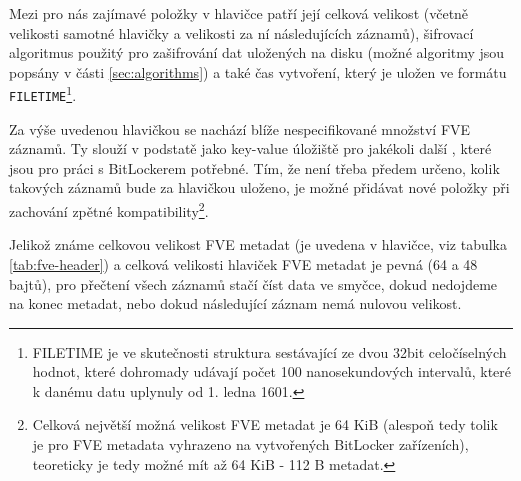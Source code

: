 
Mezi pro nás zajímavé položky v hlavičce patří její celková velikost (včetně velikosti samotné hlavičky a velikosti za ní následujících záznamů), šifrovací algoritmus použitý pro zašifrování dat uložených na disku (možné algoritmy jsou popsány v části \ref{sec:algorithms}) a také čas vytvoření, který je uložen ve formátu \texttt{FILETIME}\footnote{FILETIME je ve skutečnosti struktura sestávající ze dvou 32bit celočíselných hodnot, které dohromady udávají počet 100 nanosekundových intervalů, které k danému datu uplynuly od 1. ledna 1601.\cite{Zxwr6wjYZUQ6z8Yp}}.

\label{sec:fve-metadata-entry}

Za výše uvedenou hlavičkou se nachází blíže nespecifikované množství FVE záznamů. Ty slouží v podstatě jako key-value úložiště pro jakékoli další , které jsou pro práci s BitLockerem potřebné. Tím, že není třeba předem určeno, kolik takových záznamů bude za hlavičkou uloženo, je možné přidávat nové položky při zachování zpětné kompatibility\footnote{Celková největší možná velikost FVE metadat je 64 KiB (alespoň tedy tolik je pro FVE metadata vyhrazeno na vytvořených BitLocker zařízeních), teoreticky je tedy možné mít až 64 KiB - 112 B metadat.}.

Jelikož známe celkovou velikost FVE metadat (je uvedena v hlavičce, viz tabulka \ref{tab:fve-header}) a celková velikosti hlaviček FVE metadat je pevná (64 a 48 bajtů), pro přečtení všech záznamů stačí číst data ve smyčce, dokud nedojdeme na konec metadat, nebo dokud následující záznam nemá nulovou velikost.

